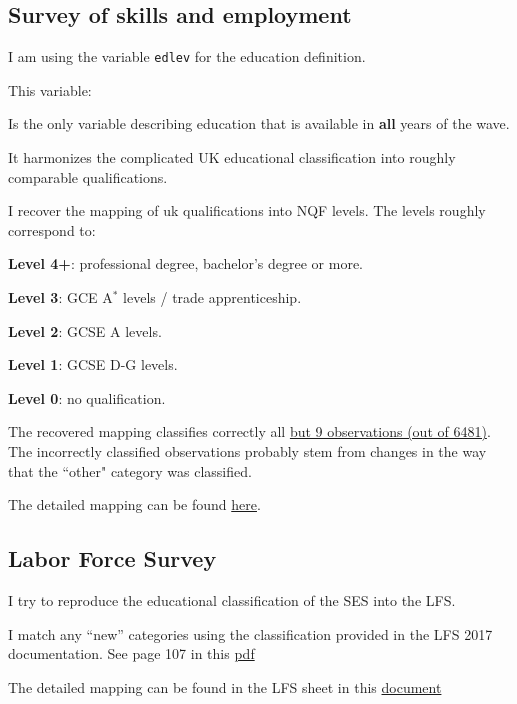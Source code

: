 \documentclass[a4paper, 12pt]{article}
\begin{document}
\subsection{Survey of skills and employment}
\bitem
\item I am using the variable \texttt{edlev} for the education definition.
\item This variable:
\bitem
	\item Is the only variable describing education that is available in \textbf{all} years of the wave.
	\item It harmonizes the complicated UK educational classification into roughly comparable qualifications.
\eitem
\item I recover the mapping of uk qualifications into NQF levels. The levels roughly correspond to:
\bitem
	\item \textbf{Level 4+}: professional degree, bachelor's degree or more.
	\item \textbf{Level 3}: GCE A$^*$ levels / trade apprenticeship.
	\item \textbf{Level 2}: GCSE A levels.
	\item \textbf{Level 1}: GCSE D-G levels.
	\item \textbf{Level 0}: no qualification.
\eitem
\item The recovered mapping classifies correctly all \href{https://www.dropbox.com/s/jnzx818eogoiepc/educationMapping.txt?dl=0}{but 9 observations (out of 6481)}. The incorrectly classified observations probably stem from changes in the way that the ``other" category was classified.
\item The detailed mapping can be found \href{https://www.dropbox.com/s/5cutdsc5n23vqdk/educationMapping.xlsx?dl=0}{here}.
\eitem

\subsection{Labor Force Survey}
\bitem
	\item I try to reproduce the educational classification of the SES into the LFS.
	\item I match any ``new'' categories using the classification provided in the LFS 2017 documentation. See page 107 in this \href{https://www.dropbox.com/s/zk285nssot3z5dw/lfs_user_guide_vol5_classifications2009.pdf?dl=0}{pdf} 
	\item The detailed mapping can be found in the LFS sheet in this \href{https://www.dropbox.com/s/5cutdsc5n23vqdk/educationMapping.xlsx?dl=0}{document}
\eitem 	
\end{document}
